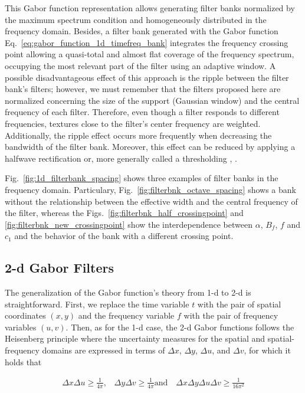 This Gabor function representation allows generating filter banks normalized by the maximum spectrum condition and homogeneously distributed in the frequency domain. Besides, a filter bank generated with the Gabor function Eq.\ \eqref{eq:gabor_function_1d_timefreq_bank} integrates the frequency crossing point allowing a quasi-total and almost flat coverage of the frequency spectrum, occupying the most relevant part of the filter using an adaptive window. A possible disadvantageous effect of this approach is the ripple between the filter bank's filters; however, we must remember that the filters proposed here are normalized concerning the size of the support (Gaussian window) and the central frequency of each filter. Therefore, even though a filter responds to different frequencies, textures close to the filter's center frequency are weighted. Additionally, the ripple effect occurs more frequently when decreasing the bandwidth of the filter bank. Moreover, this effect can be reduced by applying a halfwave rectification or, more generally called a thresholding \citep{Petkov:FGCS:1995}, \citep{Grigorescu.Petkov.ea:TIP:2003} \citep{Kruizinga.Petkov:TIP:1999}.

Fig.\ \ref{fig:1d_filterbank_spacing} shows three examples of filter banks in the frequency domain.  Particulary, Fig.\ \ref{fig:filterbnk_octave_spacing} shows a bank without the relationship between the effective width and the central frequency of the filter, whereas the Figs.\ \ref{fig:filterbnk_half_crossingpoint} and \ref{fig:filterbnk_new_crossingpoint} show the interdependence between $\alpha$, $B_f$, $f$ and $c_1$ and the behavior of the bank with a different crossing point.

\subsection{2-d Gabor Filters}
The generalization of the Gabor function's theory from 1-d to 2-d is straightforward. First, we replace the time variable $t$ with the pair of spatial coordinates $(x, y)$ and the frequency variable $f$ with the pair of frequency variables $(u, v)$. Then, as for the 1-d case, the 2-d Gabor functions follows the Heisenberg principle where the uncertainty measures for the spatial and spatial-frequency domains are expressed in terms of $\Delta x$, $\Delta y$, $\Delta u$, and $\Delta v$, for which it holds that

\begin{equation}\label{eq:uncertainty_principle_2d}
    \begin{gathered}
        \Delta x\Delta u \geq \frac{1}{4\pi}\textrm{,} \quad \Delta y\Delta v \geq \frac{1}{4\pi}\textrm{and} \quad \Delta x \Delta y \Delta u \Delta v \geq \frac{1}{16\pi^2}
    \end{gathered}
\end{equation}

